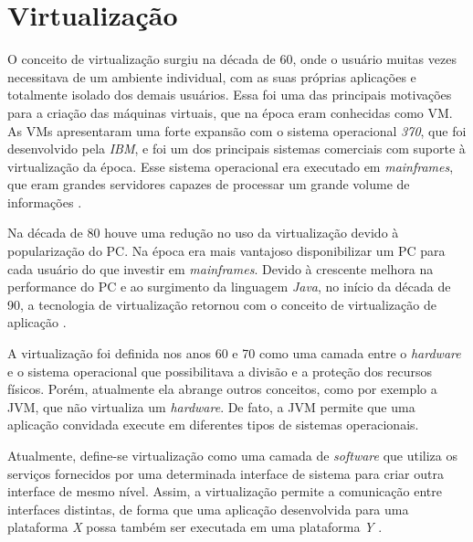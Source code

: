 \chapter{Virtualização}
\label{cap:virtualizacao}

O conceito de virtualização surgiu na década de 60, onde o usuário muitas vezes necessitava de um ambiente individual, com as suas próprias 
aplicações e totalmente isolado dos demais usuários. Essa foi uma das principais motivações para a criação das máquinas virtuais, que na época 
eram conhecidas como \ac{VM}. As \acp{VM} apresentaram uma forte expansão com o sistema operacional \textit{370}, que foi 
desenvolvido pela \textit{IBM}, e foi um dos principais sistemas comerciais com suporte à virtualização da época. Esse sistema operacional 
era executado em \textit{mainframes}, que eram grandes servidores capazes de processar um grande volume de informações \cite{laureano2008}. 

Na década de 80 houve uma redução no uso da virtualização devido à popularização do \ac{PC}. Na época era mais vantajoso disponibilizar 
um \ac{PC} para cada usuário do que investir em \textit{mainframes}. Devido à crescente melhora na performance do \ac{PC} e
ao surgimento da linguagem \textit{Java}, no início da década de 90, a tecnologia de virtualização retornou com o conceito de virtualização
de aplicação \cite{laureano2008}.

A virtualização foi definida nos anos 60 e 70 como uma camada entre o \textit{hardware} e o sistema operacional que possibilitava a 
divisão e a proteção dos recursos físicos. Porém, atualmente ela abrange outros conceitos, como por exemplo a \ac{JVM}, que não virtualiza
um \textit{hardware}. De fato, a \ac{JVM} permite que uma aplicação convidada execute em diferentes tipos de sistemas operacionais.

Atualmente, define-se virtualização como uma camada de \textit{software} que utiliza os serviços fornecidos por uma determinada interface de 
sistema para criar outra interface de mesmo nível. Assim, a virtualização permite a comunicação entre interfaces distintas, de forma que uma 
aplicação desenvolvida para uma plataforma \textit{X} possa também ser executada em uma plataforma \textit{Y} \cite{laureano2008}.

